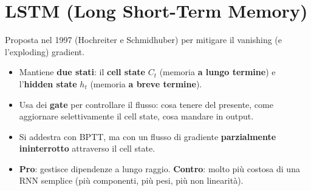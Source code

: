 \section{LSTM (Long Short-Term Memory)}
Proposta nel 1997 (Hochreiter e Schmidhuber) per mitigare il vanishing (e l'exploding) gradient.
\begin{itemize}
  \item Mantiene \textbf{due stati}: il \textbf{cell state} $C_t$ (memoria \textbf{a lungo termine}) e l'\textbf{hidden state} $h_t$
        (memoria \textbf{a breve termine}).
  \item Usa dei \textbf{gate} per controllare il flusso: cosa tenere del presente, come aggiornare selettivamente il cell state,
        cosa mandare in output.
  \item Si addestra con BPTT, ma con un flusso di gradiente \textbf{parzialmente ininterrotto} attraverso il cell state.
  \item \textbf{Pro}: gestisce dipendenze a lungo raggio. \textbf{Contro}: molto più costosa di una RNN semplice (più componenti, più
        pesi, più non linearità).
\end{itemize}

